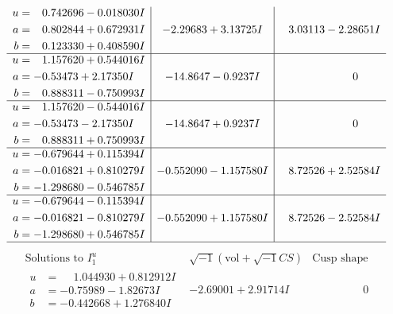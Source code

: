 \documentclass[1p]{elsarticle_modified}
\theoremstyle{definition}
\newcommand{\I}{\sqrt{-1}}
\begin{document}
$$\begin{array}{c|c|c}
\begin{aligned}
u &= \phantom{-}0.742696 - 0.018030 I \\
a &= \phantom{-}0.802844 + 0.672931 I \\
b &= \phantom{-}0.123330 + 0.408590 I\end{aligned}
 & -2.29683 + 3.13725 I & \phantom{-}3.03113 - 2.28651 I \\ \hline\begin{aligned}
u &= \phantom{-}1.157620 + 0.544016 I \\
a &= -0.53473 + 2.17350 I \\
b &= \phantom{-}0.888311 - 0.750993 I\end{aligned}
 & -14.8647 - 0.9237 I & \phantom{-0.000000 } 0 \\ \hline\begin{aligned}
u &= \phantom{-}1.157620 - 0.544016 I \\
a &= -0.53473 - 2.17350 I \\
b &= \phantom{-}0.888311 + 0.750993 I\end{aligned}
 & -14.8647 + 0.9237 I & \phantom{-0.000000 } 0 \\ \hline\begin{aligned}
u &= -0.679644 + 0.115394 I \\
a &= -0.016821 + 0.810279 I \\
b &= -1.298680 - 0.546785 I\end{aligned}
 & -0.552090 - 1.157580 I & \phantom{-}8.72526 + 2.52584 I \\ \hline\begin{aligned}
u &= -0.679644 - 0.115394 I \\
a &= -0.016821 - 0.810279 I \\
b &= -1.298680 + 0.546785 I\end{aligned}
 & -0.552090 + 1.157580 I & \phantom{-}8.72526 - 2.52584 I\\
 \hline 
 \end{array}$$\newpage$$\begin{array}{c|c|c}  
\text{Solutions to }I^u_{1}& \I (\text{vol} + \sqrt{-1}CS) & \text{Cusp shape}\\
 \hline 
\begin{aligned}
u &= \phantom{-}1.044930 + 0.812912 I \\
a &= -0.75989 - 1.82673 I \\
b &= -0.442668 + 1.276840 I\end{aligned}
 & -2.69001 + 2.91714 I & \phantom{-0.000000 } 0 \\ \hline\begin{aligned}

\end{aligned}
\end{array}$$
\end{document}
